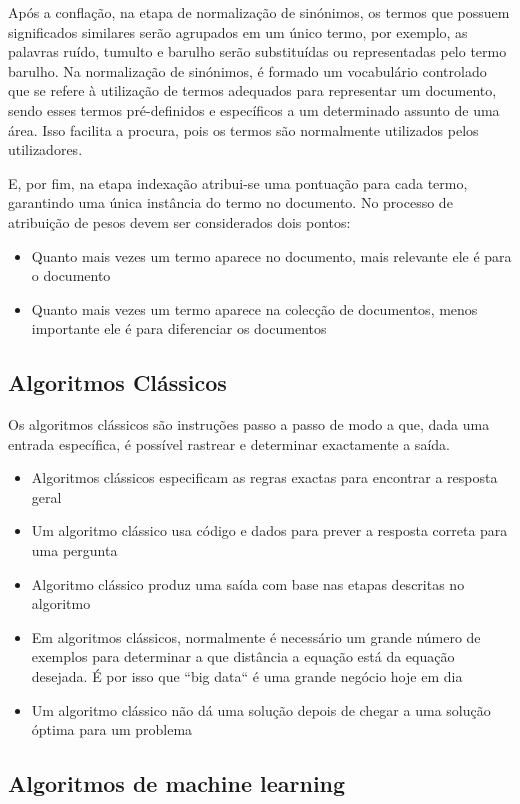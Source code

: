 \documentclass[a4paper,10pt]{article}
\begin{document}
Após a conflação, na etapa de normalização de sinónimos, os termos que possuem significados similares serão agrupados em um único termo, por exemplo, as palavras ruído, tumulto e barulho serão substituídas ou representadas pelo termo barulho.
Na normalização de sinónimos, é formado um vocabulário controlado que se refere à utilização de termos adequados para representar um documento, sendo esses termos pré-definidos e específicos a um determinado assunto de uma área.
Isso facilita a procura, pois os termos são normalmente utilizados pelos utilizadores.

E, por fim, na etapa indexação atribui-se uma pontuação para cada termo, garantindo uma única instância do termo no documento.
No processo de atribuição de pesos devem ser considerados dois pontos:
\begin{itemize}
    \item Quanto mais vezes um termo aparece no documento, mais relevante ele é para o documento
    \item Quanto mais vezes um termo aparece na colecção de documentos, menos importante ele é para diferenciar os documentos
\end{itemize}

\subsection{Algoritmos Clássicos}

Os algoritmos clássicos são instruções passo a passo de modo a que, dada uma entrada específica, é possível rastrear e determinar exactamente a saída.
\begin{itemize}
    \item Algoritmos clássicos especificam as regras exactas para encontrar a resposta geral
    \item Um algoritmo clássico usa código e dados para prever a resposta correta para uma pergunta
    \item Algoritmo clássico produz uma saída com base nas etapas descritas no algoritmo
    \item Em algoritmos clássicos, normalmente é necessário um grande número de exemplos para determinar a que distância a equação está da equação desejada. É por isso que ``big data`` é uma grande negócio hoje em dia
    \item Um algoritmo clássico não dá uma solução depois de chegar a uma solução óptima para um problema
\end{itemize}

\subsection{Algoritmos de machine learning}
\end{document}
